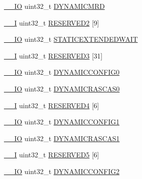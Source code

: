 \begin{DoxyCompactItemize}
\item 
\hyperlink{core__sc300_8h_aec43007d9998a0a0e01faede4133d6be}{\+\_\+\+\_\+\+IO} uint32\+\_\+t \hyperlink{struct_l_p_c___e_m_c___t_a5c6efae0a5430be118811efb2f69e5d3}{D\+Y\+N\+A\+M\+I\+C\+M\+RD}
\item 
\hyperlink{core__sc300_8h_af63697ed9952cc71e1225efe205f6cd3}{\+\_\+\+\_\+I} uint32\+\_\+t \hyperlink{struct_l_p_c___e_m_c___t_a766ff0c9eff7cbd7d9d00b7c8f055397}{R\+E\+S\+E\+R\+V\+E\+D2} \mbox{[}9\mbox{]}
\item 
\hyperlink{core__sc300_8h_aec43007d9998a0a0e01faede4133d6be}{\+\_\+\+\_\+\+IO} uint32\+\_\+t \hyperlink{struct_l_p_c___e_m_c___t_a4b06e90b495816ad321ae65fec69d375}{S\+T\+A\+T\+I\+C\+E\+X\+T\+E\+N\+D\+E\+D\+W\+A\+IT}
\item 
\hyperlink{core__sc300_8h_af63697ed9952cc71e1225efe205f6cd3}{\+\_\+\+\_\+I} uint32\+\_\+t \hyperlink{struct_l_p_c___e_m_c___t_a5781779fee44f03ebdf3490592a06d7c}{R\+E\+S\+E\+R\+V\+E\+D3} \mbox{[}31\mbox{]}
\item 
\hyperlink{core__sc300_8h_aec43007d9998a0a0e01faede4133d6be}{\+\_\+\+\_\+\+IO} uint32\+\_\+t \hyperlink{struct_l_p_c___e_m_c___t_a9e540e18b5d57f3668f2421689b52160}{D\+Y\+N\+A\+M\+I\+C\+C\+O\+N\+F\+I\+G0}
\item 
\hyperlink{core__sc300_8h_aec43007d9998a0a0e01faede4133d6be}{\+\_\+\+\_\+\+IO} uint32\+\_\+t \hyperlink{struct_l_p_c___e_m_c___t_a4fd29f97b0c8655e264629fd79ce241f}{D\+Y\+N\+A\+M\+I\+C\+R\+A\+S\+C\+A\+S0}
\item 
\hyperlink{core__sc300_8h_af63697ed9952cc71e1225efe205f6cd3}{\+\_\+\+\_\+I} uint32\+\_\+t \hyperlink{struct_l_p_c___e_m_c___t_a5be6ee872a56ca3d4796d6bb287ec307}{R\+E\+S\+E\+R\+V\+E\+D4} \mbox{[}6\mbox{]}
\item 
\hyperlink{core__sc300_8h_aec43007d9998a0a0e01faede4133d6be}{\+\_\+\+\_\+\+IO} uint32\+\_\+t \hyperlink{struct_l_p_c___e_m_c___t_a16f19ad62999ab8a705913370266f507}{D\+Y\+N\+A\+M\+I\+C\+C\+O\+N\+F\+I\+G1}
\item 
\hyperlink{core__sc300_8h_aec43007d9998a0a0e01faede4133d6be}{\+\_\+\+\_\+\+IO} uint32\+\_\+t \hyperlink{struct_l_p_c___e_m_c___t_ab3c5861c837ea74c5519328c717d248d}{D\+Y\+N\+A\+M\+I\+C\+R\+A\+S\+C\+A\+S1}
\item 
\hyperlink{core__sc300_8h_af63697ed9952cc71e1225efe205f6cd3}{\+\_\+\+\_\+I} uint32\+\_\+t \hyperlink{struct_l_p_c___e_m_c___t_a0b685e50644e53d4b7c6fa9ed6c93fc8}{R\+E\+S\+E\+R\+V\+E\+D5} \mbox{[}6\mbox{]}
\item 
\hyperlink{core__sc300_8h_aec43007d9998a0a0e01faede4133d6be}{\+\_\+\+\_\+\+IO} uint32\+\_\+t \hyperlink{struct_l_p_c___e_m_c___t_a7471aad96d64630f05c93f33ad669f7f}{D\+Y\+N\+A\+M\+I\+C\+C\+O\+N\+F\+I\+G2}

\end{DoxyCompactItemize}
